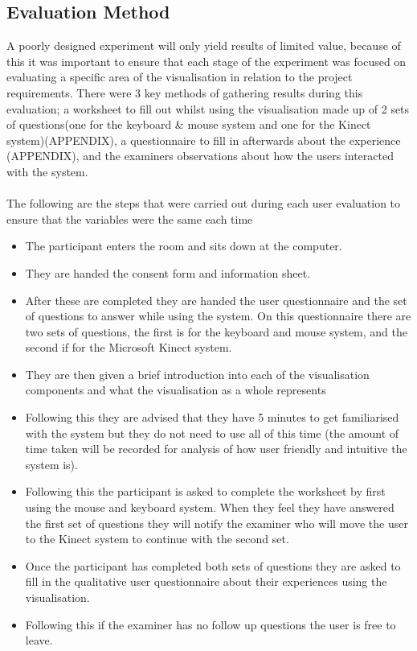 \subsection{Evaluation Method}
A poorly designed experiment will only yield results of limited value, because
of this it was important to ensure that each stage of the experiment was
focused on evaluating a specific area of the visualisation in relation to the
project requirements. There were 3 key methods of gathering results during this
evaluation; a
worksheet to fill out whilst using the visualisation made up of 2 sets of
questions(one for the keyboard \& mouse system and one for the Kinect
system)(APPENDIX), a questionnaire to
fill in afterwards about the experience (APPENDIX), and the examiners
observations about
how the users interacted with the system.  
\\\\
The following are the steps that were carried out during each user evaluation to
ensure that the variables were the same each time
\begin{itemize}
\item The participant enters the room and sits down at the computer.
\item They are handed the consent form and information sheet.
\item After these are completed they are handed the user questionnaire and the
set of questions to answer while using the system. On this questionnaire there
are two sets of questions, the first is for the keyboard and mouse system, and
the second if for the Microsoft Kinect system.
\item They are then given a brief introduction into each of the visualisation
components and what the visualisation as a whole represents
\item Following this they are advised that they have 5 minutes to get
familiarised with the system but they do not need to use all of this time (the
amount of time taken will be recorded for analysis of how user friendly and
intuitive the system is).
\item Following this the participant is asked to complete the worksheet by first
using the mouse and keyboard system. When they feel they have answered the first
set of questions they will notify the examiner who will move the user to the
Kinect
system to continue with the second set.
\item Once the participant has completed both sets of questions they are asked
to fill
in the qualitative user questionnaire about their experiences using the
visualisation. 
\item Following this if the examiner has no follow up questions the user is free
to leave.
\end{itemize}

